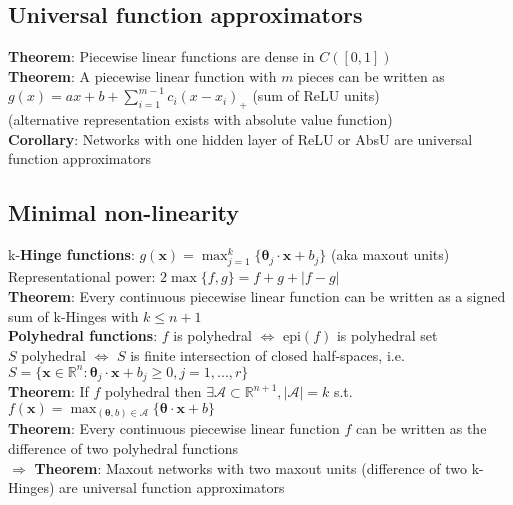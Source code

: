 \subsection*{Universal function approximators}
\textbf{Theorem}: Piecewise linear functions are dense in $C([0,1])$\\
\textbf{Theorem}: A piecewise linear function with $m$ pieces can be written as $g(x)=ax+b+\sum_{i=1}^{m-1}c_i(x-x_i)_+$ (sum of ReLU units)\\
(alternative representation exists with absolute value function)\\
\textbf{Corollary}: Networks with one hidden layer of ReLU or AbsU are universal function approximators
\subsection*{Minimal non-linearity}
k-\textbf{Hinge functions}: $g(\mathbf x)=\max_{j=1}^k\{\pmb\theta_j\cdot\mathbf x+b_j\}$ (aka maxout units)\\
Representational power: $2\max\{f,g\}=f+g+|f-g|$\\
\textbf{Theorem}: Every continuous piecewise linear function can be written as a signed sum of k-Hinges with $k\leq n+1$\\
\textbf{Polyhedral functions}: $f$ is polyhedral $\Leftrightarrow$ epi$(f)$ is polyhedral set\\
$S$ polyhedral $\Leftrightarrow$ $S$ is finite intersection of closed half-spaces, i.e.\\
$S=\{\mathbf x\in\mathbb R^n: \pmb\theta_j\cdot\mathbf x+b_j\geq0,j=1,...,r\}$\\
\textbf{Theorem}: If $f$ polyhedral then $\exists \mathcal A\subset\mathbb R^{n+1},|\mathcal A|=k$ s.t. \\$f(\mathbf x)=\max_{(\pmb\theta,b)\in\mathcal A}\{\pmb\theta\cdot \mathbf x+b\}$\\
\textbf{Theorem}: Every continuous piecewise linear function $f$ can be written as the difference of two polyhedral functions\\
$\Rightarrow$ \textbf{Theorem}: Maxout networks with two maxout units (difference of two k-Hinges) are universal function approximators



